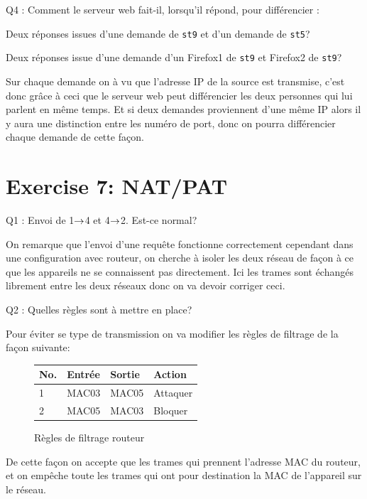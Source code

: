 \documentclass[11pt, openright]{book}
\begin{document}
\begin{dent}{Q4 :} Comment le serveur web fait-il, lorsqu'il répond, pour différencier :
	\begin{items}{-15pt}{-15pt}
		\item Deux réponses issues d'une demande de \texttt{st9} et d'un demande de \texttt{st5}?
		\item Deux réponses issue d'une demande d'un Firefox1 de \texttt{st9} et Firefox2 de \texttt{st9}?
	\end{items}
	
	Sur chaque demande on à vu que l'adresse IP de la source est transmise, c'est donc grâce à ceci que le serveur web peut différencier les deux personnes qui lui parlent en même temps. Et si deux demandes proviennent d'une même IP alors il y aura une distinction entre les numéro de port, donc on pourra différencier chaque demande de cette façon. 
	
\end{dent}

\newpage

\section{Exercise 7: NAT/PAT}

\begin{dent}{Q1 :} Envoi de 1$\displaystyle{\to }$4 et 4$\displaystyle{\to }$2. Est-ce normal?
	
	On remarque que l'envoi d'une requête fonctionne correctement cependant dans une configuration avec routeur, on cherche à isoler les deux réseau de façon à ce que les appareils ne se connaissent pas directement. Ici les trames sont échangés librement entre les deux réseaux donc on va devoir corriger ceci. 
	
\end{dent}

\begin{dent}{Q2 :} Quelles règles sont à mettre en place?
	
	Pour éviter se type de transmission on va modifier les règles de filtrage de la façon suivante:
	\begin{figure}[ht!]
		\centering
		\begin{tabular}{|l|l|l|l|}
			\hline
			No. & Entrée & Sortie & Action   \\
			\hline
			1   & MAC03  & MAC05  & Attaquer \\
			\hline
			2   & MAC05  & MAC03  & Bloquer  \\
			\hline
		\end{tabular}
		\caption{Règles de filtrage routeur}
	\end{figure}
	
	De cette façon on accepte que les trames qui prennent l'adresse MAC du routeur, et on empêche toute les trames qui ont pour destination la MAC de l'appareil sur le réseau.
	
\end{dent}
\end{document}
